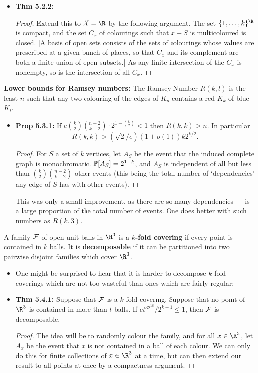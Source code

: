\documentclass[11pt]{article}
\newenvironment{INT}[1][]{\begin{itemize}\small\item\textbf{#1}}{\end{itemize}}
\newcommand{\moreINT}[1][]{\item\textbf{#1}}
\begin{document}
\begin{chapter5}
\begin{itemise}
\begin{INT}[Thm 5.2.2:]
\begin{proof}
\INDENT Extend this to $X=\R$ by the following argument. The set $\{1,\ldots,k\}^{\R}$ is compact, and the set $C_x$ of colourings such that $x+S$ is multicoloured is closed. [A basis of open sets consists of the sets of colourings whose values are prescribed at a given bunch of places, so that $C_x$ and its complement are both a finite union of open subsets.] As any finite intersection of the $C_x$ is nonempty, so is the intersection of all $C_x$.
\end{proof}
\end{INT}
\item \textbf{Lower bounds for Ramsey numbers:} The Ramsey Number $R(k,l)$ is the least $n$ such that any two-colouring of the edges of $K_n$ contains a red $K_k$ of blue $K_l$.
\begin{INT}[Prop 5.3.1:]
If $e{k\choose 2}{n-2\choose k-2}\cdot2^{1-{k\choose2}}<1$ then $R(k,k)>n$. In particular \[R(k,k)>(\sqrt2/e)(1+o(1))k2^{k/2}.\]
\begin{proof}
For $S$ a set of $k$ vertices, let $A_S$ be the event that the induced complete graph is monochromatic. $\operatorname{\mathbb{P}}[A_S]=2^{1-k}$, and $A_S$ is independent of all but less than ${k\choose 2}{n-2\choose k-2}$ other events (this being the total number of `dependencies' any edge of $S$ has with other events).
\end{proof}
This was only a small improvement, as there are so many dependencies ---  is a large proportion of the total number of events. One does better with such numbers as $R(k,3)$.
\end{INT}
\item %
A family $\mathcal{F}$ of open unit balls in $\R^3$ is a \textbf{$k$-fold covering} if every point is contained in $k$ balls. It is \textbf{decomposable} if it can be partitioned into two pairwise disjoint families which cover $\R^3$.
\begin{INT}
One might be surprised to hear that it is harder to decompose $k$-fold coverings which are not too wasteful than ones which are fairly regular:
\moreINT[Thm 5.4.1:]
Suppose that $\mathcal{F}$ is a $k$-fold covering. Suppose that no point of $\R^3$ is contained in more than $t$ balls. If $et^32^{18}/2^{k-1}\leq1$, then $\mathcal{F}$ is decomposable.
\begin{proof}
The idea will be to randomly colour the family, and for all $x\in\R^3$, let $A_x$ be the event that $x$ is not contained in a ball of each colour. We can only do this for finite collections of $x\in\R^3$ at a time, but can then extend our result to all points at once by a compactness argument.


\end{proof}
\end{INT}
\end{itemise}
\end{chapter5}
\end{document}
